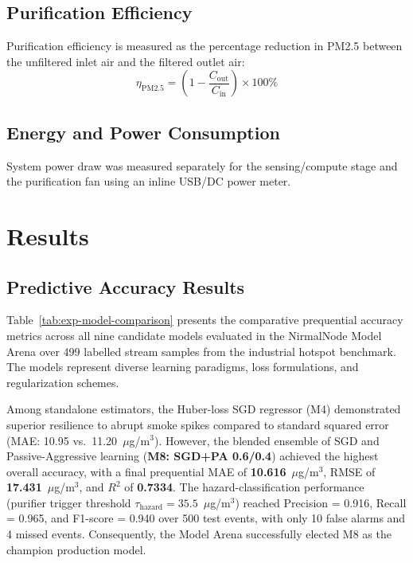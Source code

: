 \subsection{Purification Efficiency}
Purification efficiency is measured as the percentage reduction in PM2.5 between the unfiltered inlet air and the filtered outlet air:
\begin{equation}
\eta_{\mathrm{PM2.5}} = \left(1 - \frac{C_{\mathrm{out}}}{C_{\mathrm{in}}}\right) \times 100\%
\label{eq:purification-efficiency}
\end{equation}

\subsection{Energy and Power Consumption}
System power draw was measured separately for the sensing/compute stage and the purification fan using an inline USB/DC power meter.

\section{Results}
\label{sec:exp-results}

\subsection{Predictive Accuracy Results}
\label{sec:exp-accuracy-result}

Table~\ref{tab:exp-model-comparison} presents the comparative prequential accuracy metrics across all nine candidate models evaluated in the NirmalNode Model Arena over 499 labelled stream samples from the industrial hotspot benchmark. The models represent diverse learning paradigms, loss formulations, and regularization schemes.

Among standalone estimators, the Huber-loss SGD regressor (M4) demonstrated superior resilience to abrupt smoke spikes compared to standard squared error (MAE: 10.95 vs.\ 11.20~$\mu$g/m$^3$). However, the blended ensemble of SGD and Passive-Aggressive learning (\textbf{M8: SGD+PA 0.6/0.4}) achieved the highest overall accuracy, with a final prequential MAE of \textbf{10.616}~$\mu$g/m$^3$, RMSE of \textbf{17.431}~$\mu$g/m$^3$, and $R^2$ of \textbf{0.7334}. The hazard-classification performance (purifier trigger threshold $\tau_{\text{hazard}} = 35.5$~$\mu$g/m$^3$) reached Precision = 0.916, Recall = 0.965, and F1-score = 0.940 over 500 test events, with only 10 false alarms and 4 missed events. Consequently, the Model Arena successfully elected M8 as the champion production model.


